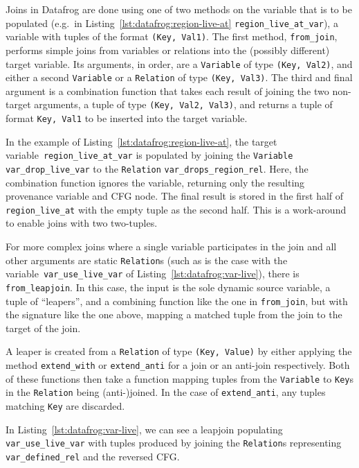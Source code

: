 \documentclass[11pt,a4paper,twoside,openany,draft]{report}
\newcommand{\InRust}[1]{\texttt{#1}}
\begin{document}
Joins in Datafrog are done using one of two methods on the variable that is to
be populated (e.g.\ in Listing~\ref{lst:datafrog:region-live-at}
\InRust{region_live_at_var}), a variable with tuples of the format \InRust{(Key,
  Val1)}. The first method, \InRust{from_join}, performs simple joins from
variables or relations into the (possibly different) target variable. Its
arguments, in order, are a \InRust{Variable} of type \InRust{(Key, Val2)}, and
either a second \InRust{Variable} or a \InRust{Relation} of type \InRust{(Key,
  Val3)}. The third and final argument is a combination function that takes each
result of joining the two non-target arguments, a tuple of type \InRust{(Key,
  Val2, Val3)}, and returns a tuple of format \InRust{Key, Val1} to be inserted
into the target variable.

In the example of Listing~\ref{lst:datafrog:region-live-at}, the target
variable~\InRust{region_live_at_var} is populated by joining the
\InRust{Variable} \InRust{var_drop_live_var} to the \InRust{Relation}
\InRust{var_drops_region_rel}. Here, the combination function ignores the
variable, returning only the resulting provenance variable and CFG node. The
final result is stored in the first half of \InRust{region_live_at} with the
empty tuple as the second half. This is a work-around to enable joins with two
two-tuples.

For more complex joins where a single variable participates in the join and all
other arguments are static \InRust{Relation}s (such as is the case with the
variable~\InRust{var_use_live_var} of Listing~\ref{lst:datafrog:var-live}), there is
\InRust{from_leapjoin}. In this case, the input is the sole dynamic source
variable, a tuple of ``leapers'', and a combining function like the one in
\InRust{from_join}, but with the signature like the one above, mapping a matched
tuple from the join to the target of the join.

A leaper is created from a \InRust{Relation} of type \InRust{(Key, Value)} by
either applying the method \InRust{extend_with} or \InRust{extend_anti} for a
join or an anti-join respectively. Both of these functions then take a function
mapping tuples from the \InRust{Variable} to \InRust{Key}s in the
\InRust{Relation} being (anti-)joined. In the case of \InRust{extend_anti}, any
tuples matching \InRust{Key} are discarded.

In Listing~\ref{lst:datafrog:var-live}, we can see a leapjoin populating
\InRust{var_use_live_var} with tuples produced by joining the \InRust{Relation}s
representing \InRust{var_defined_rel} and the reversed CFG\@.
\end{document}
